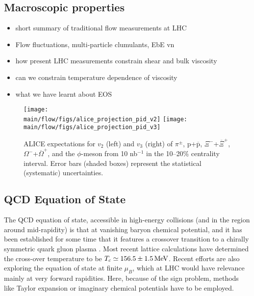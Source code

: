\subsection{Macroscopic properties}\label{sec:macro}


\begin{itemize}
  \item short summary of traditional flow measurements at LHC
  \item Flow fluctuations,  multi-particle clumulants,  EbE vn
  \item how present LHC measurements constrain shear and bulk viscosity
  \item can we constrain temperature dependence of viscosity 
  \item what we have learnt about EOS
\end{itemize}

\begin{figure}[!htb]
\begin{center}
\texttt{[image: \\main/flow/figs/alice\_projection\_pid\_v2]}
\texttt{[image: \\main/flow/figs/alice\_projection\_pid\_v3]}
\caption{ALICE expectations for $v_2$ (left) and $v_3$ (right) of $\pi^\pm$, $\mathrm{p}$+$\overline{\mathrm{p}}$, $\Xi^-$+$\overline{\Xi}^+$, $\Omega^-$+$\overline{\Omega}^+$, and the $\phi$-meson from 10 nb$^{-1}$ in the 10--20\% centrality interval. Error bars (shaded boxes) represent the statistical (systematic) uncertainties.}
\label{fig:alice_vn}
\end{center}
\end{figure}


\subsection{QCD Equation of State}
The QCD equation of state, accessible in high-energy collisions (and in the region around mid-rapidity) is that at vanishing baryon chemical potential, and it has been established for some time that it features a crossover transition to a chirally symmetric quark gluon plasma \cite{Aoki:2006we}. Most recent lattice calculations \cite{Steinbrecher:2018phh} have determined the cross-over temperature to be $T_c\simeq 156.5 \pm 1.5\,{\rm MeV}$. Recent efforts are also exploring the equation of state at finite $\mu_B$, which at LHC would have relevance mainly at very forward rapidities. Here, because of the sign problem, methods like Taylor expansion \cite{Kaczmarek:2011zz,Endrodi:2011gv,Bazavov:2015zja,Bonati:2018nut} or imaginary chemical potentials \cite{Cea:2014xva,Bonati:2014kpa,Bonati:2015bha,Bellwied:2015rza,Cea:2015cya} have to be employed. 

